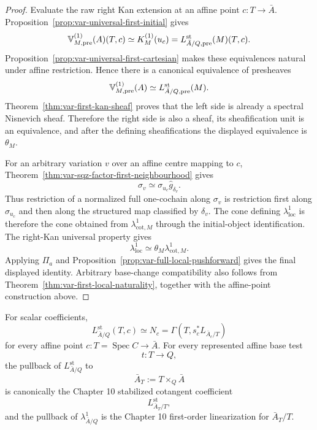 \begin{proof}
Evaluate the raw right Kan extension at an affine point \(c:T\to\bar A\). Proposition~\ref{prop:var-universal-first-initial} gives
\[
    \mathbb V^{(1)}_{M,\mathrm{pre}}(A)(T,c)
    \simeq
    K_M^{(1)}(u_c)
    =
    L^{\mathrm{st}}_{\bar A/Q,\mathrm{pre}}(M)(T,c).
\]
Proposition~\ref{prop:var-universal-first-cartesian} makes these equivalences natural under affine restriction. Hence there is a canonical equivalence of presheaves
\[
    \mathbb V^{(1)}_{M,\mathrm{pre}}(A)
    \simeq
    L^{\mathrm{st}}_{\bar A/Q,\mathrm{pre}}(M).
\]
Theorem~\ref{thm:var-first-kan-sheaf} proves that the left side is already a spectral Nisnevich sheaf. Therefore the right side is also a sheaf, its sheafification unit is an equivalence, and after the defining sheafifications the displayed equivalence is \(\theta_M\).

For an arbitrary variation \(v\) over an affine centre mapping to \(c\), Theorem~\ref{thm:var-sqz-factor-first-neighbourhood} gives
\[
    \sigma_v
    \simeq
    \sigma_{u_c}\widehat g_{\delta_v}.
\]
Thus restriction of a normalized full one-cochain along \(\sigma_v\) is restriction first along \(\sigma_{u_c}\) and then along the structured map classified by \(\delta_v\). The cone defining \(\lambda^1_{\mathrm{loc}}\) is therefore the cone obtained from \(\lambda^1_{\mathrm{cot},M}\) through the initial-object identification. The right-Kan universal property gives
\[
    \lambda^1_{\mathrm{loc}}
    \simeq
    \theta_M\lambda^1_{\mathrm{cot},M}.
\]
Applying \(\Pi_a\) and Proposition~\ref{prop:var-full-local-pushforward} gives the final displayed identity. Arbitrary base-change compatibility also follows from Theorem~\ref{thm:var-first-local-naturality}, together with the affine-point construction above.
\end{proof}

\begin{proposition}
\label{prop:var-scalar-affine-cotangent}
For scalar coefficients,
\[
    \boxed{
    L^{\mathrm{st}}_{\bar A/Q}(T,c)
    \simeq
    N_c
    =
    \Gamma(T,s_c^*L_{\bar A_c/T})
    }
\]
for every affine point \(c:T=\operatorname{Spec}C\to\bar A\). For every represented affine base test
\[
    t:T\longrightarrow Q,
\]
the pullback of \(L^{\mathrm{st}}_{\bar A/Q}\) to
\[
    \bar A_T:=T\times_Q\bar A
\]
is canonically the Chapter 10 stabilized cotangent coefficient
\[
    L^{\mathrm{st}}_{\bar A_T/T},
\]
and the pullback of \(\lambda^1_{\bar A/Q}\) is the Chapter 10 first-order linearization for \(\bar A_T/T\).
\end{proposition}

